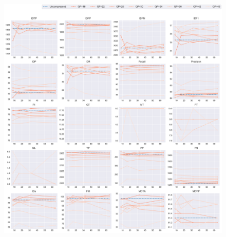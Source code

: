 \begin{figure}[!htbp]
\centering
\includegraphics[width=1.0\linewidth]{img/appendix/BasketballDrive_all_multiplots_msr.pdf}
\caption[Result of all object classes in Class B BasketballDrive with Horizontal Axis of MSR]{}
\label{fig:BasketballDrive_all_msr}
\end{figure}



